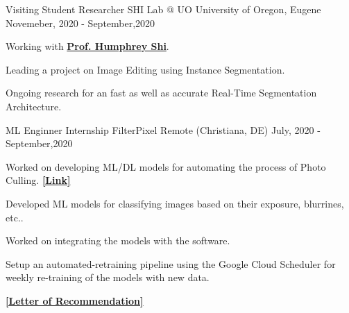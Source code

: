 

\begin{cventries}

 \cventry
    {Visiting Student Researcher} %
    {SHI Lab @ UO} %
    {University of Oregon, Eugene} %
    {Novemeber, 2020 - September,2020} %
   {
      \begin{cvitems} %
        \item {Working with {\href{https://www.humphreyshi.com/home}{\bf Prof. Humphrey Shi}}.}
        \item {Leading a project on Image Editing using Instance Segmentation.}
        \item{Ongoing research for an fast as well as accurate Real-Time Segmentation Architecture.}
      \end{cvitems}
   }

 \cventry
    {ML Enginner Internship} %
    {FilterPixel} %
    {Remote (Christiana, DE)} %
    {July, 2020 - September,2020} %
   {
      \begin{cvitems} %
        \item {Worked on developing ML/DL models for automating the process of Photo Culling. {\href{https://filterpixel.com/}{\bf [Link]}}}
        \item {Developed ML models for classifying images based on their exposure, blurrines, etc..}
        \item{Worked on integrating the models with the software.}
        \item {Setup an automated-retraining pipeline using the Google Cloud Scheduler for weekly re-training of the models with new data.}
        \item{{\href{https://drive.google.com/file/d/1xJ0p8pYX4rOSBdi9CIVnEnFIeTiE094T/view?usp=sharing}{\textbf{[Letter of Recommendation]}}}}
      \end{cvitems}
   }

\end{cventries}